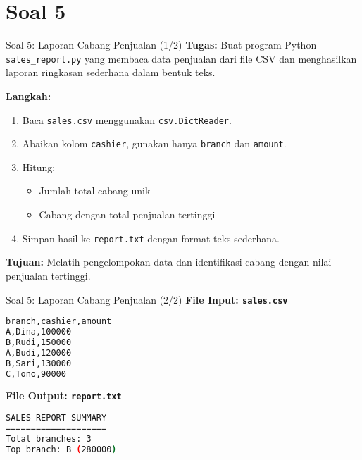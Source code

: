 \documentclass[aspectratio=169, table]{beamer}
\begin{document}
\section{Soal 5}
\begin{frame}[fragile]{Soal 5: Laporan Cabang Penjualan (1/2)}
\vspace{15pt}
\textbf{Tugas:}  
Buat program Python \texttt{sales\_report.py} yang membaca data penjualan dari file CSV dan menghasilkan laporan ringkasan sederhana dalam bentuk teks.

\textbf{Langkah:}
\begin{enumerate}
  \item Baca \texttt{sales.csv} menggunakan \texttt{csv.DictReader}.
  \item Abaikan kolom \texttt{cashier}, gunakan hanya \texttt{branch} dan \texttt{amount}.
  \item Hitung:
        \begin{itemize}
          \item Jumlah total cabang unik
          \item Cabang dengan total penjualan tertinggi
        \end{itemize}
  \item Simpan hasil ke \texttt{report.txt} dengan format teks sederhana.
\end{enumerate}

\textbf{Tujuan:}  
Melatih pengelompokan data dan identifikasi cabang dengan nilai penjualan tertinggi.
\end{frame}

\begin{frame}[fragile]{Soal 5: Laporan Cabang Penjualan (2/2)}
\vspace{15pt}
\textbf{File Input: \texttt{sales.csv}}
\begin{lstlisting}[language=bash,basicstyle=\ttfamily\small]
branch,cashier,amount
A,Dina,100000
B,Rudi,150000
A,Budi,120000
B,Sari,130000
C,Tono,90000
\end{lstlisting}

\textbf{File Output: \texttt{report.txt}}
\begin{lstlisting}[language=bash,basicstyle=\ttfamily\small]
SALES REPORT SUMMARY
====================
Total branches: 3
Top branch: B (280000)
\end{lstlisting}
\end{frame}
\end{document}
